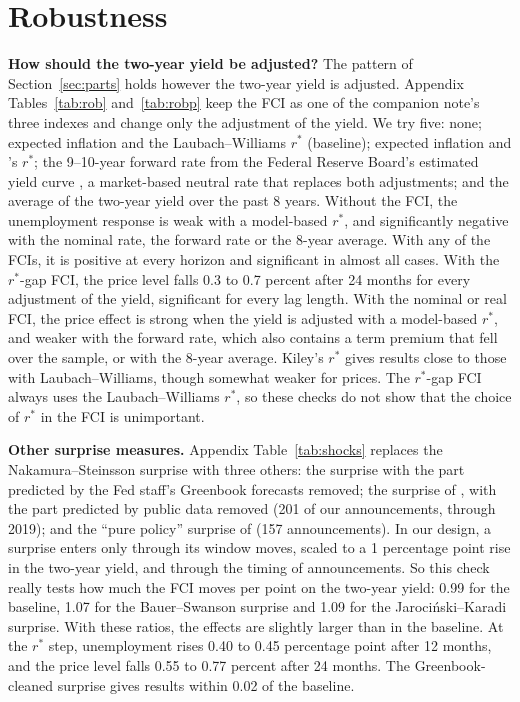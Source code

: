 \documentclass[11pt]{article}
\newcommand{\rs}{r^{*}}
\begin{document}
\section{Robustness}\label{sec:rob}
\textbf{How should the two-year yield be adjusted?} The pattern of Section~\ref{sec:parts} holds however the two-year yield is adjusted. Appendix Tables~\ref{tab:rob} and~\ref{tab:robp} keep the FCI as one of the companion note's three indexes and change only the adjustment of the yield. We try five: none; expected inflation and the Laubach--Williams $\rs$ (baseline); expected inflation and \citet{kiley2020}'s $\rs$; the 9--10-year forward rate from the Federal Reserve Board's estimated yield curve \citep{gurkaynak2007}, a market-based neutral rate that replaces both adjustments; and the average of the two-year yield over the past 8 years. Without the FCI, the unemployment response is weak with a model-based $\rs$, and significantly negative with the nominal rate, the forward rate or the 8-year average. With any of the FCIs, it is positive at every horizon and significant in almost all cases. With the $\rs$-gap FCI, the price level falls 0.3 to 0.7 percent after 24 months for every adjustment of the yield, significant for every lag length. With the nominal or real FCI, the price effect is strong when the yield is adjusted with a model-based $\rs$, and weaker with the forward rate, which also contains a term premium that fell over the sample, or with the 8-year average. Kiley's $\rs$ gives results close to those with Laubach--Williams, though somewhat weaker for prices. The $\rs$-gap FCI always uses the Laubach--Williams $\rs$, so these checks do not show that the choice of $\rs$ in the FCI is unimportant.

\textbf{Other surprise measures.} Appendix Table~\ref{tab:shocks} replaces the Nakamura--Steinsson surprise with three others: the surprise with the part predicted by the Fed staff's Greenbook forecasts removed; the surprise of \citet{bauer2023}, with the part predicted by public data removed (201 of our announcements, through 2019); and the ``pure policy'' surprise of \citet{jarocinski2020} (157 announcements). In our design, a surprise enters only through its window moves, scaled to a 1 percentage point rise in the two-year yield, and through the timing of announcements. So this check really tests how much the FCI moves per point on the two-year yield: 0.99 for the baseline, 1.07 for the Bauer--Swanson surprise and 1.09 for the Jaroci\'nski--Karadi surprise. With these ratios, the effects are slightly larger than in the baseline. At the $\rs$ step, unemployment rises 0.40 to 0.45 percentage point after 12 months, and the price level falls 0.55 to 0.77 percent after 24 months. The Greenbook-cleaned surprise gives results within 0.02 of the baseline.
\end{document}
